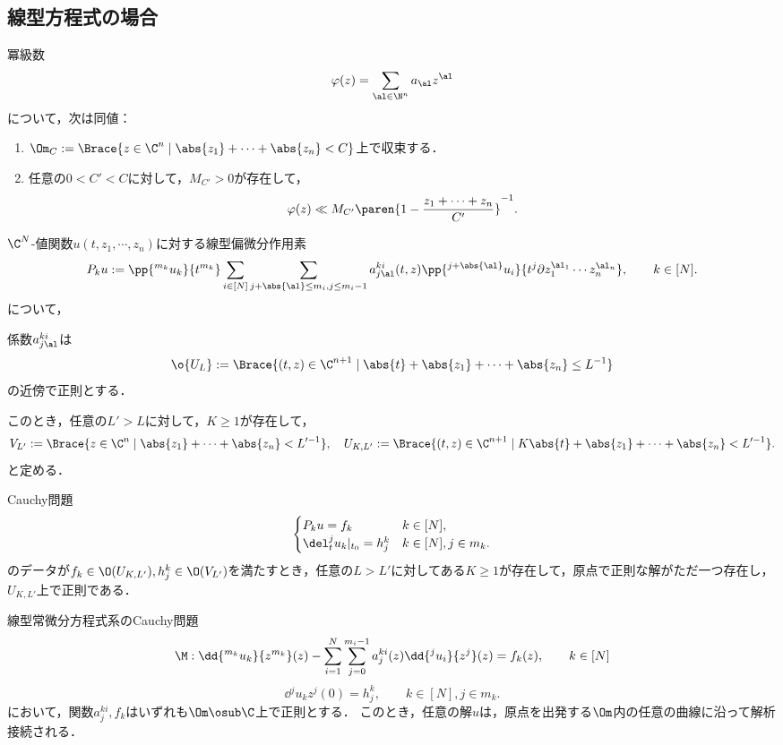 \documentclass[uplatex,dvipdfmx]{jsreport}
\begin{document}
\subsection{線型方程式の場合}

\begin{lemma}
    冪級数
    \[\varphi(z)=\sum_{\al\in\N^n}a_\al z^\al\]
    について，次は同値：
    \begin{enumerate}
        \item $\Om_C:=\Brace{z\in\C^n\mid\abs{z_1}+\cdots+\abs{z_n}<C}$上で収束する．
        \item 任意の$0<C'<C$に対して，$M_{C'}>0$が存在して，
        \[\varphi(z)\ll M_{C'}\paren{1-\frac{z_1+\cdots+z_n}{C'}}^{-1}.\]
    \end{enumerate}
\end{lemma}

\begin{theorem}
    $\C^N$-値関数$u(t,z_1,\cdots,z_n)$に対する線型偏微分作用素
    \[P_ku:=\pp{^{m_k}u_k}{t^{m_k}}\sum_{i\in[N]}\sum_{j+\abs{\al}\le m_i,j\le m_i-1}a_{j\al}^{ki}(t,z)\pp{^{j+\abs{\al}}u_i}{t^j\partial z_1^{\al_1}\cdots z_n^{\al_n}},\qquad k\in[N].\]
    について，
    \begin{enumerate}[{[C}1{]}]
        \item 係数$a_{j\al}^{ki}$は
        \[\o{U_L}:=\Brace{(t,z)\in\C^{n+1}\mid\abs{t}+\abs{z_1}+\cdots+\abs{z_n}\le L^{-1}}\]
        の近傍で正則とする．
        \item このとき，任意の$L'>L$に対して，$K\ge1$が存在して，
        \[V_{L'}:=\Brace{z\in\C^n\mid\abs{z_1}+\cdots+\abs{z_n}<L'^{-1}},\quad U_{K,L'}:=\Brace{(t,z)\in\C^{n+1}\mid K\abs{t}+\abs{z_1}+\cdots+\abs{z_n}<L'^{-1}}.\]
        と定める．
    \end{enumerate}
    Cauchy問題
    \[\begin{cases}
        P_ku=f_k&k\in[N],\\
        \del^j_tu_k|_{t_0}=h_j^k&k\in[N],j\in m_k.
    \end{cases}\]
    のデータが$f_k\in\O(U_{K,L'}),h_j^k\in\O(V_{L'})$を満たすとき，任意の$L>L'$に対してある$K\ge1$が存在して，原点で正則な解がただ一つ存在し，$U_{K,L'}$上で正則である．
\end{theorem}

\begin{theorem}[局所解の正則延長]
    線型常微分方程式系のCauchy問題
    \[\M:\dd{^{m_k}u_k}{z^{m_k}}(z)-\sum_{i=1}^N\sum_{j=0}^{m_i-1}a_j^{ki}(z)\dd{^ju_i}{z^j}(z)=f_k(z),\qquad k\in[N]\]
    \[\dd{^ju_k}{z^j}(0)=h^k_j,\qquad k\in[N],j\in m_k.\]
    において，関数$a_j^{ki},f_k$はいずれも$\Om\osub\C$上で正則とする．
    このとき，任意の解$u$は，原点を出発する$\Om$内の任意の曲線に沿って解析接続される．
\end{theorem}
\end{document}
